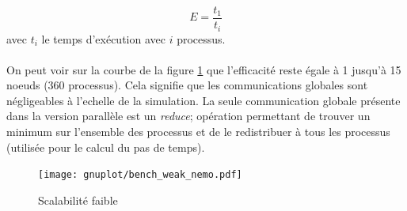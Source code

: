 $$E=\frac{t_1}{t_i}$$ avec $t_i$ le temps d'exécution avec $i$ processus.


\paragraph{}On peut voir sur la courbe de la figure \ref{fig:weak_scaling} que l'efficacité reste égale à 1 jusqu'à 15 noeuds (360 processus). Cela signifie que les communications globales sont négligeables à l'echelle de la simulation. La seule communication globale présente dans la version parallèle est un \textit{reduce}; opération permettant de trouver un minimum sur l'ensemble des processus et de le redistribuer à tous les processus (utilisée pour le calcul du pas de temps).

\begin{figure}[ht]
  \centering
  \texttt{[image: gnuplot/bench\_weak\_nemo.pdf]}
  \caption{\label{fig:weak_scaling} Scalabilité faible}
\end{figure}





